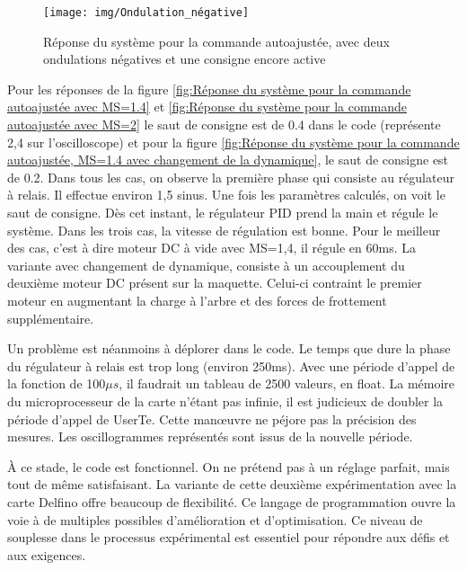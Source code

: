\begin{figure}[h]
	\centering
	\texttt{[image: img/Ondulation\_négative]}
	\caption{Réponse du système pour la commande autoajustée, avec deux ondulations négatives et une consigne encore active}
	\label{fig:Réponse du système pour la commande autoajustée, avec deux ondulations négatives}
\end{figure}

Pour les réponses de la figure \ref{fig:Réponse du système pour la commande autoajustée avec MS=1.4} et \ref{fig:Réponse du système pour la commande autoajustée avec MS=2} le saut de consigne est de 0.4 dans le code (représente 2,4 sur l'oscilloscope) et pour la figure \ref{fig:Réponse du système pour la commande autoajustée, MS=1.4 avec changement de la dynamique}, le saut de consigne est de 0.2. Dans tous les cas, on observe la première phase qui consiste au régulateur à relais. Il effectue environ 1,5 sinus. Une fois les paramètres calculés, on voit le saut de consigne. Dès cet instant, le régulateur PID prend la main et régule le système. Dans les trois cas, la vitesse de régulation est bonne. Pour le meilleur des cas, c'est à dire moteur DC à vide avec MS=1,4, il régule en 60ms. La variante avec changement de dynamique, consiste à un accouplement du deuxième moteur DC présent sur la maquette. Celui-ci contraint le premier moteur en augmentant la charge à l'arbre et des forces de frottement supplémentaire.

Un problème est néanmoins à déplorer dans le code. Le temps que dure la phase du régulateur à relais est trop long (environ 250ms). Avec une période d'appel de la fonction de 100$\mu s$, il faudrait un tableau de 2500 valeurs, en float. La mémoire du microprocesseur de la carte n'étant pas infinie, il est judicieux de doubler la période d'appel de UserTe. Cette manœuvre ne péjore pas la précision des mesures. Les oscillogrammes représentés sont issus de la nouvelle période.

\`A ce stade, le code est fonctionnel. On ne prétend pas à un réglage parfait, mais tout de même satisfaisant. La variante de cette deuxième expérimentation avec la carte Delfino offre beaucoup de flexibilité. Ce langage de programmation ouvre la voie à de multiples possibles d'amélioration et d'optimisation. Ce niveau de souplesse dans le processus expérimental est essentiel pour répondre aux défis et aux exigences. 


